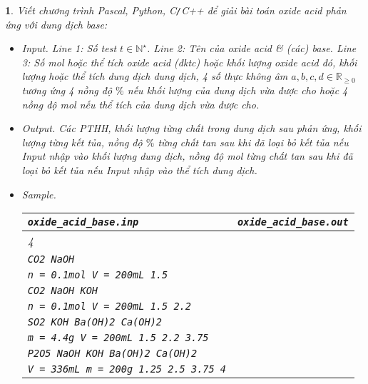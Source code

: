 \documentclass{article}
\newtheorem{baitoan}{}
\begin{document}
\begin{baitoan}
	Viết chương trình {\sf Pascal, Python, C{\tt/}C++} để giải bài toán oxide acid phản ứng với dung dịch base:
	\begin{itemize}
		\item {\sf Input.} Line 1: Số test $t\in\mathbb{N}^\star$. Line 2: Tên của oxide acid \& (các) base. Line 3: Số mol hoặc thể tích oxide acid (đktc) hoặc khối lượng oxide acid đó, khối lượng hoặc thể tích dung dịch dung dịch, 4 số thực không âm $a,b,c,d\in\mathbb{R}_{\ge0}$ tương ứng 4  nồng độ $\%$ nếu khối lượng của dung dịch vừa được cho hoặc 4 nồng độ mol nếu thể tích của dung dịch vừa được cho.
		\item {\sf Output.} Các {\rm PTHH}, khối lượng từng chất trong dung dịch sau phản ứng, khối lượng từng kết tủa, nồng độ $\%$ từng chất tan sau khi đã loại bỏ kết tủa nếu Input nhập vào khối lượng dung dịch, nồng độ mol từng chất tan sau khi đã loại bỏ kết tủa nếu Input nhập vào thể tích dung dịch.
		\item {\sf Sample.}
		\begin{table}[H]
			\centering
			\begin{tabular}{|l|l|}
				\hline
				\verb|oxide_acid_base.inp| & \verb|oxide_acid_base.out| \\
				\hline
				4 &  \\
				{\tt CO2 NaOH} &  \\
				{\tt n = 0.1mol V = 200mL 1.5} &  \\
				{\tt CO2 NaOH KOH} &  \\
				{\tt n = 0.1mol V = 200mL 1.5 2.2} &  \\
				{\tt SO2 KOH Ba(OH)2 Ca(OH)2} &  \\
				{\tt m = 4.4g V = 200mL 1.5 2.2 3.75} &  \\
				{\tt P2O5 NaOH KOH Ba(OH)2 Ca(OH)2}&  \\
				{\tt V = 336mL m = 200g 1.25 2.5 3.75 4}&  \\
				\hline
			\end{tabular}
		\end{table}		
	\end{itemize}
\end{baitoan}


\printbibliography[heading=bibintoc]
\end{document}
